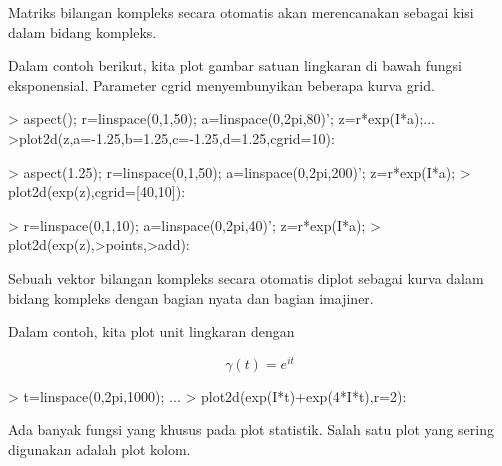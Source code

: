 \documentclass[a4paper,10pt]{article}
\begin{document}
\begin{eulernotebook}
\begin{eulercomment}
\begin{eulercomment}
\begin{eulercomment}
\begin{eulercomment}
\begin{eulercomment}
\begin{eulercomment}
\begin{eulercomment}
Matriks bilangan kompleks secara otomatis akan merencanakan sebagai
kisi dalam bidang kompleks.

Dalam contoh berikut, kita plot gambar satuan lingkaran di bawah
fungsi eksponensial. Parameter cgrid menyembunyikan beberapa kurva
grid.
\end{eulercomment}
\begin{eulerprompt}
> aspect(); r=linspace(0,1,50); a=linspace(0,2pi,80)'; z=r*exp(I*a);...
>plot2d(z,a=-1.25,b=1.25,c=-1.25,d=1.25,cgrid=10):
\end{eulerprompt}
\begin{eulerprompt}
> aspect(1.25); r=linspace(0,1,50); a=linspace(0,2pi,200)'; z=r*exp(I*a);
> plot2d(exp(z),cgrid=[40,10]):
\end{eulerprompt}
\begin{eulerprompt}
> r=linspace(0,1,10); a=linspace(0,2pi,40)'; z=r*exp(I*a);
> plot2d(exp(z),>points,>add):
\end{eulerprompt}
\begin{eulercomment}
Sebuah vektor bilangan kompleks secara otomatis diplot sebagai kurva
dalam bidang kompleks dengan bagian nyata dan bagian imajiner.

Dalam contoh, kita plot unit lingkaran dengan

\end{eulercomment}
\begin{eulerformula}
\[
\gamma(t) = e^{it}
\]
\end{eulerformula}
\begin{eulerprompt}
> t=linspace(0,2pi,1000); ...
> plot2d(exp(I*t)+exp(4*I*t),r=2):
\end{eulerprompt}
\begin{eulercomment}
Ada banyak fungsi yang khusus pada plot statistik. Salah satu plot
yang sering digunakan adalah plot kolom.


\end{eulercomment}
\end{eulercomment}
\end{eulercomment}
\end{eulercomment}
\end{eulercomment}
\end{eulercomment}
\end{eulercomment}
\end{eulernotebook}
\end{document}
